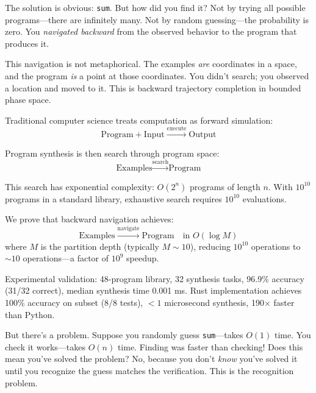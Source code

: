 \documentclass[twocolumn,10pt]{article}
\theoremstyle{definition}
\theoremstyle{remark}
\begin{document}
\noindent The solution is obvious: \texttt{sum}. But how did you find it? Not by trying all possible programs—there are infinitely many. Not by random guessing—the probability is zero. You \textit{navigated backward} from the observed behavior to the program that produces it.

\vspace{0.2cm}
\noindent This navigation is not metaphorical. The examples \textit{are} coordinates in a space, and the program \textit{is} a point at those coordinates. You didn't search; you observed a location and moved to it. This is backward trajectory completion in bounded phase space.

\vspace{0.2cm}
\noindent Traditional computer science treats computation as forward simulation:
\begin{equation}
\text{Program} + \text{Input} \xrightarrow{\text{execute}} \text{Output}
\end{equation}

\noindent Program synthesis is then search through program space:
\begin{equation}
\text{Examples} \xrightarrow{\text{search}} \text{Program}
\end{equation}

\noindent This search has exponential complexity: $O(2^n)$ programs of length $n$. With $10^{10}$ programs in a standard library, exhaustive search requires $10^{10}$ evaluations.

\vspace{0.2cm}
\noindent We prove that backward navigation achieves:
\begin{equation}
\text{Examples} \xrightarrow{\text{navigate}} \text{Program} \quad \text{in } O(\log M)
\end{equation}
where $M$ is the partition depth (typically $M \sim 10$), reducing $10^{10}$ operations to $\sim 10$ operations—a factor of $10^9$ speedup.

\vspace{0.2cm}
\noindent Experimental validation: 48-program library, 32 synthesis tasks, 96.9\% accuracy (31/32 correct), median synthesis time 0.001 ms. Rust implementation achieves 100\% accuracy on subset (8/8 tests), $<1$ microsecond synthesis, 190$\times$ faster than Python.

\vspace{0.2cm}
\noindent But there's a problem. Suppose you randomly guess \texttt{sum}—takes $O(1)$ time. You check it works—takes $O(n)$ time. Finding was faster than checking! Does this mean you've solved the problem? No, because you don't \textit{know} you've solved it until you recognize the guess matches the verification. This is the recognition problem.
\end{document}
